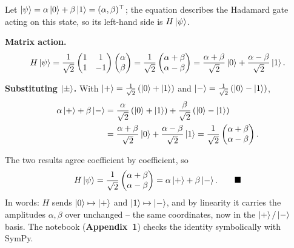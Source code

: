 \documentclass[a4paper, 10pt]{article}
\begin{document}
\begin{solution}
	\noindent Let \( \ket{\psi} = \alpha\ket{0} + \beta\ket{1} = (\alpha, \beta)^{\top} \); the equation describes the Hadamard gate acting on this state, so its left-hand side is \( H\ket{\psi} \).

	\noindent \textbf{Matrix action.}
	\[
		H\ket{\psi}
		= \frac{1}{\sqrt{2}}\begin{pmatrix} 1 & 1 \\ 1 & -1 \end{pmatrix}\begin{pmatrix} \alpha \\ \beta \end{pmatrix}
		= \frac{1}{\sqrt{2}}\begin{pmatrix} \alpha + \beta \\ \alpha - \beta \end{pmatrix}
		= \frac{\alpha + \beta}{\sqrt{2}}\ket{0} + \frac{\alpha - \beta}{\sqrt{2}}\ket{1}.
	\]

	\noindent \textbf{Substituting \( \ket{\pm} \).} With \( \ket{+} = \tfrac{1}{\sqrt{2}}\left(\ket{0} + \ket{1}\right) \) and \( \ket{-} = \tfrac{1}{\sqrt{2}}\left(\ket{0} - \ket{1}\right) \),
	\begin{align*}
		\alpha\ket{+} + \beta\ket{-}
		 & = \frac{\alpha}{\sqrt{2}}\left(\ket{0} + \ket{1}\right) + \frac{\beta}{\sqrt{2}}\left(\ket{0} - \ket{1}\right) \\
		 & = \frac{\alpha + \beta}{\sqrt{2}}\ket{0} + \frac{\alpha - \beta}{\sqrt{2}}\ket{1}
		= \frac{1}{\sqrt{2}}\begin{pmatrix} \alpha + \beta \\ \alpha - \beta \end{pmatrix}.
	\end{align*}

	\noindent The two results agree coefficient by coefficient, so
	\[
		H\ket{\psi} = \frac{1}{\sqrt{2}}\begin{pmatrix} \alpha + \beta \\ \alpha - \beta \end{pmatrix} = \alpha\ket{+} + \beta\ket{-} . \qquad \blacksquare
	\]
	In words: \( H \) sends \( \ket{0} \mapsto \ket{+} \) and \( \ket{1} \mapsto \ket{-} \), and by linearity it carries the amplitudes \( \alpha, \beta \) over unchanged -- the same coordinates, now in the \( \ket{+}/\ket{-} \) basis.
	The notebook (\textbf{Appendix~1}) checks the identity symbolically with SymPy.
\end{solution}
\end{document}
